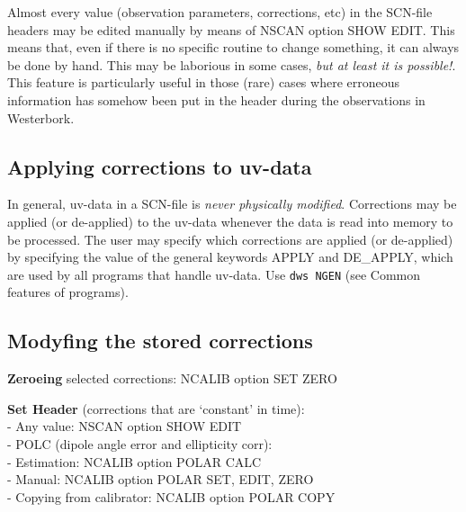 	Almost every value (observation parameters, corrections, etc) in the
SCN-file headers may be edited manually by means of NSCAN option 
SHOW EDIT.  This means that, even if there is no specific \NEWSTAR routine to
change something, it can always be done by hand.  This may be laborious in some
cases, {\em but at least it is possible!}.  This feature is particularly useful
in those (rare) cases where erroneous information has somehow been put in the
header during the observations in Westerbork. 

\subsection{Applying corrections to uv-data} 
\label{scn.apply} 

	In general, uv-data in a SCN-file is {\em never physically modified}.
Corrections may be applied (or de-applied) to the uv-data whenever the data is
read into memory to be processed.  The user may specify which corrections are
applied (or de-applied) by specifying the value of the general \NEWSTAR
keywords APPLY and DE\_APPLY, which are used by all \NEWSTAR programs that
handle uv-data.  Use {\tt dws NGEN} 
(see Common features of \NEWSTAR programs). 

\subsection{Modyfing the stored corrections} 
\label{scn.modify} 

{\bf Zeroeing} selected corrections: NCALIB option SET ZERO 

{\bf Set Header} (corrections that are `constant' in time):\\ 
- Any value: NSCAN option SHOW EDIT\\ 
- POLC (dipole angle error and ellipticity corr):\\ 
\hspace*{5mm} - Estimation: NCALIB option POLAR CALC\\ 
\hspace*{5mm} - Manual: NCALIB option POLAR SET, EDIT, ZERO\\ 
\hspace*{5mm} - Copying from calibrator: NCALIB option POLAR COPY\\ 


